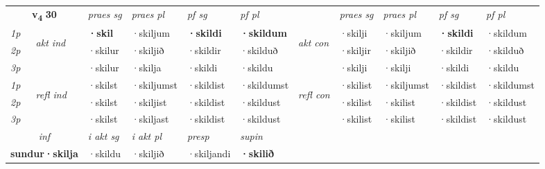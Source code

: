 \noindent
\begin{tabular}{lllllllllll} \toprule
\multicolumn{2}{c}{\textbf{v{\textsubscript{4}}} \Large{\textbf{30}}}  &  \textit{praes sg}  & \textit{praes pl}  &\textit{ pf sg} & \textit{pf pl} &  &  \textit{praes sg}  & \textit{praes pl}  & \textit{pf sg} & \textit{pf pl } \\*
	\cmidrule{3-6} \cmidrule{8-11}
 {\textit{1p}} & \multirow{3}{*}{\begin{turn}{90}\textit{akt ind}\end{turn}} & \textbf{·skil} & ·skiljum & \textbf{·skildi} & \textbf{·skildum} & \multirow{3}{*}{\begin{turn}{90}\textit{akt con}\end{turn}} &·skilji & ·skiljum & \textbf{·skildi} & ·skildum\\*
 {\textit{2p}} &  &  ·skilur  & ·skiljið & ·skildir & ·skilduð & & ·skiljir & ·skiljið & ·skildir & ·skilduð \\*
{\textit{3p}} &  & ·skilur & ·skilja & ·skildi & ·skildu & & ·skilji & ·skilji& ·skildi & ·skildu \\*
\cmidrule{3-6} \cmidrule{8-11}
 {\textit{1p}} & \multirow{3}{*}{\begin{turn}{90}\textit{refl ind}\end{turn}}  & ·skilst & ·skiljumst & ·skildist & ·skildumst & \multirow{3}{*}{\begin{turn}{90}\textit{refl con}\end{turn}}  &·skilist & ·skiljumst & ·skildist & ·skildumst \\*
 {\textit{2p}} &  & ·skilst & ·skiljist & ·skildist & ·skildust & &·skilist & ·skilist & ·skildist & ·skildust \\*
 {\textit{3p}}  & & ·skilst & ·skiljast & ·skildist & ·skildust & & ·skilist & ·skilist& ·skildist & ·skildust \\*
\cmidrule{3-6} \cmidrule{8-11}

   \multicolumn{2}{c}{\textit{inf}}  & \textit{i akt sg} & \textit{i akt pl}   & \textit{presp} & \textit{supin}   \\*
  \multicolumn{2}{c}{\textbf{sundur\allowbreak ·skilja}} & ·skildu  & ·skiljið   & ·skiljandi &  \textbf{·skilið}   \\*
\end{tabular}

